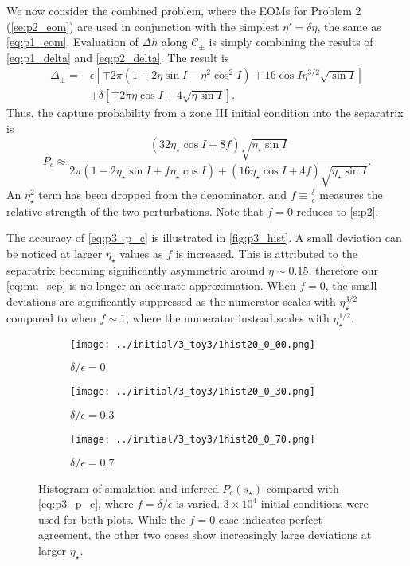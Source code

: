 \documentclass[
        fleqn,
        usenatbib,
    ]{mnras}
\newcommand*{\p}[1]{\left(#1\right)}
\newcommand*{\s}[1]{\left[#1\right]}
\begin{document}
We now consider the combined problem, where the EOMs for Problem 2
(\autoref{se:p2_eom}) are used in conjunction with the simplest $\eta' = \delta
\eta$, the same as \autoref{eq:p1_eom}. Evaluation of $\Delta h$ along
$\mathcal{C}_{\pm}$ is simply combining the results of \autoref{eq:p1_delta} and
\autoref{eq:p2_delta}. The result is
\begin{align}
    \Delta_{\pm} ={}& \epsilon\s{
        \mp 2\pi \p{1 - 2\eta \sin I - \eta^2 \cos^2 I}
            + 16\cos I\eta^{3/2}\sqrt{\sin I}}\nonumber\\
        &+ \delta \s{\mp 2\pi \eta \cos I + 4\sqrt{\eta \sin I}}.
\end{align}
Thus, the capture probability from a zone III initial condition into the
separatrix is
\begin{equation}
    P_c \approx \frac{\p{32 \eta_\star \cos I + 8f}\sqrt{\eta_\star \sin I}}{
        2\pi\p{1 - 2\eta_{\star}\sin I + f\eta_\star \cos I}
            + \p{16\eta_\star\cos I + 4f} \sqrt{\eta_\star\sin I}}.
            \label{eq:p3_p_c}
\end{equation}
An $\eta_\star^2$ term has been dropped from the denominator, and $f \equiv
\frac{\delta}{\epsilon}$ measures the relative strength of the two
perturbations. Note that $f = 0$ reduces to \autoref{s:p2}.

The accuracy of \autoref{eq:p3_p_c} is illustrated in \autoref{fig:p3_hist}. A
small deviation can be noticed at larger $\eta_\star$ values as $f$ is
increased. This is attributed to the separatrix becoming significantly
asymmetric around $\eta \sim 0.15$, therefore our \autoref{eq:mu_sep} is no
longer an accurate approximation. When $f = 0$, the small deviations are
significantly suppressed as the numerator scales with $\eta_\star^{3/2}$
compared to when $f \sim 1$, where the numerator instead scales with
$\eta_{\star}^{1/2}$.
\begin{figure}
    \centering
    \begin{subfigure}{\columnwidth}
        \centering
        \texttt{[image: ../initial/3\_toy3/1hist20\_0\_00.png]}
        \caption{$\delta/\epsilon = 0$}
    \end{subfigure}

    \begin{subfigure}{\columnwidth}
        \centering
        \texttt{[image: ../initial/3\_toy3/1hist20\_0\_30.png]}
        \caption{$\delta/\epsilon = 0.3$}
    \end{subfigure}

    \begin{subfigure}{\columnwidth}
        \centering
        \texttt{[image: ../initial/3\_toy3/1hist20\_0\_70.png]}
        \caption{$\delta/\epsilon = 0.7$}
    \end{subfigure}
    \caption{Histogram of simulation and inferred $P_c(s_\star)$ compared with
    \autoref{eq:p3_p_c}, where $f = \delta/\epsilon$ is varied. $3 \times 10^4$
    initial conditions were used for both plots. While the $f = 0$ case
    indicates perfect agreement, the other two cases show increasingly large
    deviations at larger $\eta_\star$.}\label{fig:p3_hist}
\end{figure}
\end{document}
